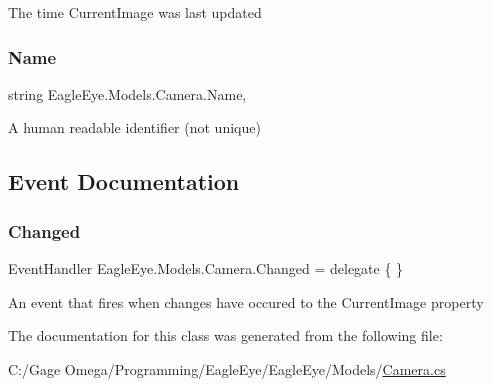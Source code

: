 The time Current\+Image was last updated 

\mbox{\label{class_eagle_eye_1_1_models_1_1_camera_a45941e18deb09a8e294e7c858da9caa0}} 
\subsubsection{\texorpdfstring{Name}{Name}}
{\footnotesize\ttfamily string Eagle\+Eye.\+Models.\+Camera.\+Name\hspace{0.3cm}{\ttfamily [get]}, {\ttfamily [set]}}



A human readable identifier (not unique) 



\subsection{Event Documentation}
\mbox{\label{class_eagle_eye_1_1_models_1_1_camera_a4a8b47c765bd44f8ca6a89e59d3d3b94}} 
\subsubsection{\texorpdfstring{Changed}{Changed}}
{\footnotesize\ttfamily Event\+Handler Eagle\+Eye.\+Models.\+Camera.\+Changed = delegate \{ \}}



An event that fires when changes have occured to the Current\+Image property 



The documentation for this class was generated from the following file\+:\begin{DoxyCompactItemize}
\item 
C\+:/\+Gage Omega/\+Programming/\+Eagle\+Eye/\+Eagle\+Eye/\+Models/\mbox{\hyperlink{_models_2_camera_8cs}{Camera.\+cs}}\end{DoxyCompactItemize}
